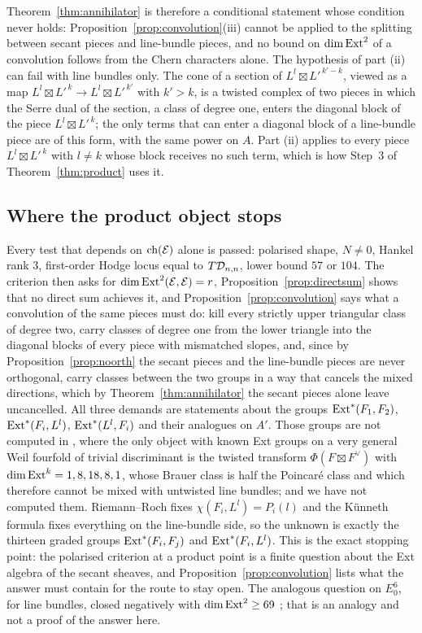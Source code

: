 Theorem~\ref{thm:annihilator} is therefore a conditional statement whose condition never holds: Proposition~\ref{prop:convolution}(iii) cannot be applied to the splitting between secant pieces and line-bundle pieces, and no bound on $\dim\mathrm{Ext}^{2}$ of a convolution follows from the Chern characters alone. The hypothesis of part (ii) can fail with line bundles only. The cone of a section of $L^{l}\boxtimes L'^{\,k'-k}$, viewed as a map $L^{l}\boxtimes L'^{\,k}\to L^{l}\boxtimes L'^{\,k'}$ with $k'>k$, is a twisted complex of two pieces in which the Serre dual of the section, a class of degree one, enters the diagonal block of the piece $L^{l}\boxtimes L'^{\,k}$; the only terms that can enter a diagonal block of a line-bundle piece are of this form, with the same power on $A$. Part (ii) applies to every piece $L^{l}\boxtimes L'^{\,k}$ with $l\ne k$ whose block receives no such term, which is how Step~3 of Theorem~\ref{thm:product} uses it.

\subsection{Where the product object stops}\label{ssec:f2stop1}

Every test that depends on $\mathrm{ch}(\mathcal{E})$ alone is passed: polarised shape, $N\ne0$, Hankel rank $3$, first-order Hodge locus equal to $T\mathcal{D}_{n,n}$, lower bound $57$ or $104$. The criterion then asks for $\dim\mathrm{Ext}^{2}(\mathcal{E},\mathcal{E})=r$, Proposition~\ref{prop:directsum} shows that no direct sum achieves it, and Proposition~\ref{prop:convolution} says what a convolution of the same pieces must do: kill every strictly upper triangular class of degree two, carry classes of degree one from the lower triangle into the diagonal blocks of every piece with mismatched slopes, and, since by Proposition~\ref{prop:noorth} the secant pieces and the line-bundle pieces are never orthogonal, carry classes between the two groups in a way that cancels the mixed directions, which by Theorem~\ref{thm:annihilator} the secant pieces alone leave uncancelled. All three demands are statements about the groups $\mathrm{Ext}^{*}(F_{1},F_{2})$, $\mathrm{Ext}^{*}(F_{i},L^{l})$, $\mathrm{Ext}^{*}(L^{l},F_{i})$ and their analogues on $A'$. Those groups are not computed in \cite{Mar25a,Mar25b,Mar25c}, where the only object with known Ext groups on a very general Weil fourfold of trivial discriminant is the twisted transform $\Phi(F\boxtimes F^{\vee})$ with $\dim\mathrm{Ext}^{k}=1,8,18,8,1$, whose Brauer class is half the Poincar\'e class and which therefore cannot be mixed with untwisted line bundles; and we have not computed them. Riemann--Roch fixes $\chi(F_{i},L^{l})=P_{i}(l)$ and the K\"unneth formula fixes everything on the line-bundle side, so the unknown is exactly the thirteen graded groups $\mathrm{Ext}^{*}(F_{i},F_{j})$ and $\mathrm{Ext}^{*}(F_{i},L^{l})$. This is the exact stopping point: the polarised criterion at a product point is a finite question about the Ext algebra of the secant sheaves, and Proposition~\ref{prop:convolution} lists what the answer must contain for the route to stay open. The analogous question on $E_{0}^{6}$, for line bundles, closed negatively with $\dim\mathrm{Ext}^{2}\ge69$ \cite[Thm.~18.35]{BMB26}; that is an analogy and not a proof of the answer here.

